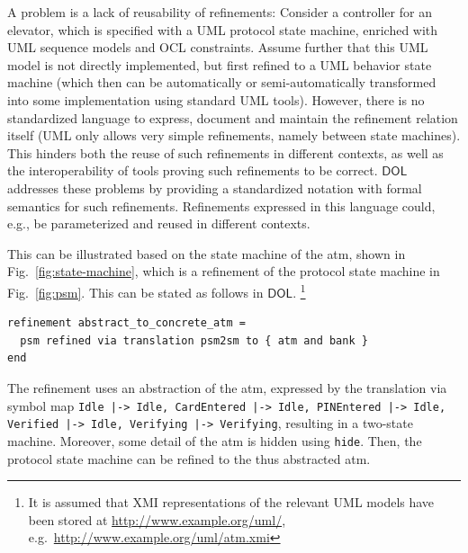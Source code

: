 \documentclass[10pt, a4paper]{isov2}
\newcommand*{\syntax}[1]{\texttt{#1}}
\newcommand*{\DOL}{\ensuremath{\mathsf{DOL}}\xspace}
\newcommand{\uml}[1]{\textsf{#1}}
\begin{document}
\label{model-2}

A problem is a lack of reusability of refinements: Consider a controller for an elevator, which is specified with a UML protocol state machine, enriched with UML 
sequence models and OCL constraints. Assume further that this UML model is not directly implemented, but first refined to a UML behavior state machine (which then 
can be automatically or semi-automatically transformed into some implementation using standard UML tools). However, there is no standardized language to 
express, document and maintain the refinement relation itself (UML only allows very simple refinements, namely between state machines). This hinders both the 
reuse of such refinements in different contexts, as well as the interoperability of tools proving such refinements to be correct. \DOL  
addresses these problems by providing a standardized notation with formal semantics for such refinements. Refinements expressed in this language could, e.g., be 
parameterized and reused in different contexts.

 This can be illustrated based on the state
machine of the \uml{atm}, shown in Fig.~\ref{fig:state-machine}, which is a  
refinement of the protocol state machine in Fig.~\ref{fig:psm}. This can be stated as follows in \DOL. 
\footnote{  It is assumed that XMI representations of the relevant UML models have been 
stored at \url{http://www.example.org/uml/},
e.g.\ \url{http://www.example.org/uml/atm.xmi} } 


\begin{lstlisting}[basicstyle=\ttfamily,language=dolText,escapechar=@,mathescape]
refinement abstract_to_concrete_atm =
  psm refined via translation psm2sm to { atm and bank }
end
\end{lstlisting}

The refinement uses an abstraction of the \uml{atm}, expressed by the
translation via symbol map \texttt{Idle |-> Idle, CardEntered |-> Idle, PINEntered |-> Idle, Verified |-> Idle, Verifying |-> Verifying}, resulting in a two-state machine. Moreover, some detail of the \uml{atm} is hidden using
\syntax{hide}. Then, the protocol state machine can be refined to
the thus abstracted \uml{atm}.

\end{document}
